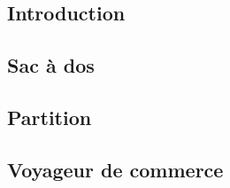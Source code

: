 \subsection{Introduction}


\subsection{Sac à dos}


\subsection{Partition}


\subsection{Voyageur de commerce}

